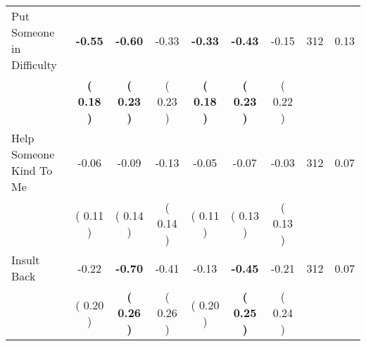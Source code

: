 \begin{tabular}{lcccccccc}
Put Someone in Difficulty & \textbf{    -0.55} & \textbf{    -0.60} &     -0.33 & \textbf{    -0.33} & \textbf{    -0.43} &     -0.15 & 312 &       0.13 \\ 
 & \textbf{(     0.18 )} & \textbf{(     0.23 )} & (     0.23 ) & \textbf{(     0.18 )} & \textbf{(     0.23 )} & (     0.22 ) & \\
Help Someone Kind To Me &     -0.06 &     -0.09 &     -0.13 &     -0.05 &     -0.07 &     -0.03 & 312 &       0.07 \\ 
 & (     0.11 ) & (     0.14 ) & (     0.14 ) & (     0.11 ) & (     0.13 ) & (     0.13 ) & \\
Insult Back &     -0.22 & \textbf{    -0.70} &     -0.41 &     -0.13 & \textbf{    -0.45} &     -0.21 & 312 &       0.07 \\ 
 & (     0.20 ) & \textbf{(     0.26 )} & (     0.26 ) & (     0.20 ) & \textbf{(     0.25 )} & (     0.24 ) & \\
\bottomrule
\end{tabular}
